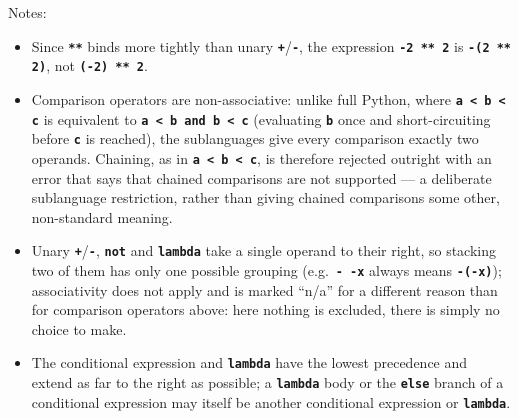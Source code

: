 Notes:
\begin{itemize}
\item Since \texttt{\textbf{**}} binds more tightly than unary
  \texttt{\textbf{+}}/\texttt{\textbf{-}}, the expression
  \texttt{\textbf{-2 ** 2}} is \texttt{\textbf{-(2 ** 2)}}, not
  \texttt{\textbf{(-2) ** 2}}.
\item Comparison operators are non-associative: unlike full Python,
  where \texttt{\textbf{a < b < c}} is equivalent to
  \texttt{\textbf{a < b and b < c}} (evaluating \texttt{\textbf{b}} once
  and short-circuiting before \texttt{\textbf{c}} is reached), the
  sublanguages give every comparison exactly two operands. Chaining, as in
  \texttt{\textbf{a < b < c}}, is therefore rejected outright with an
  error that says that chained comparisons are not supported --- a
  deliberate sublanguage restriction, rather than
  giving chained comparisons some other, non-standard meaning.
\item Unary \texttt{\textbf{+}}/\texttt{\textbf{-}}, \textbf{\texttt{not}}
  and \textbf{\texttt{lambda}} take a single operand to their right, so
  stacking two of them has only one possible grouping (e.g.\
  \texttt{\textbf{- -x}} always means \texttt{\textbf{-(-x)}});
  associativity does not apply and is marked ``n/a'' for a different
  reason than for comparison operators above: here nothing is excluded,
  there is simply no choice to make.
\item The conditional expression and \textbf{\texttt{lambda}} have the
  lowest precedence and extend as far to the right as possible; a
  \textbf{\texttt{lambda}} body or the \textbf{\texttt{else}} branch of a
  conditional expression may itself be another conditional expression or
  \textbf{\texttt{lambda}}.
\end{itemize}
